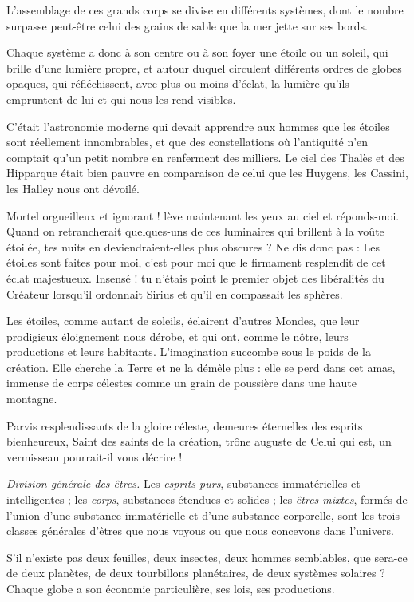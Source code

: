 \documentclass[a4paper, 11pt, oneside]{article}
\begin{document}
L'assemblage de ces grands corps se divise en différents systèmes, dont le nombre surpasse peut-être celui des grains de sable que la mer jette sur ses bords.

Chaque système a donc à son centre ou à son foyer une étoile ou un soleil, qui brille d'une lumière propre, et autour duquel circulent différents ordres de globes opaques, qui réfléchissent, avec plus ou moins d'éclat, la lumière qu'ils empruntent de lui et qui nous les rend visibles.

C'était l'astronomie moderne qui devait apprendre aux hommes que les étoiles sont réellement innombrables, et que des constellations où l'antiquité n'en comptait qu'un petit nombre en renferment des milliers. Le ciel des Thalès et des Hipparque était bien pauvre en comparaison de celui que les Huygens, les Cassini, les Halley nous ont dévoilé.

Mortel orgueilleux et ignorant ! lève maintenant les yeux au ciel et réponds-moi. Quand on retrancherait quelques-uns de ces luminaires qui brillent à la voûte étoilée, tes nuits en deviendraient-elles plus obscures ? Ne dis donc pas : Les étoiles sont faites pour moi, c'est pour moi que le firmament resplendit de cet éclat majestueux. Insensé ! tu n'étais point le premier objet des libéralités du Créateur lorsqu'il ordonnait Sirius et qu'il en compassait les sphères.

Les étoiles, comme autant de soleils, éclairent d'autres Mondes, que leur prodigieux éloignement nous dérobe, et qui ont, comme le nôtre, leurs productions et leurs habitants. L'imagination succombe sous le poids de la création. Elle cherche la Terre et ne la démêle plus : elle se perd dans cet amas, immense de corps célestes comme un grain de poussière dans une haute montagne.

Parvis resplendissants de la gloire céleste, demeures éternelles des esprits bienheureux, Saint des saints de la création, trône auguste de Celui qui est, un vermisseau pourrait-il vous décrire !

\emph{Division générale des êtres.} Les \emph{esprits purs}, substances immatérielles et intelligentes ; les \emph{corps}, substances étendues et solides ; les \emph{êtres mixtes}, formés de l'union d'une substance immatérielle et d'une substance corporelle, sont les trois classes générales d'êtres que nous voyous ou que nous concevons dans l'univers.

S'il n'existe pas deux feuilles, deux insectes, deux hommes semblables, que sera-ce de deux planètes, de deux tourbillons planétaires, de deux systèmes solaires ? Chaque globe a son économie particulière, ses lois, ses productions.
\end{document}
